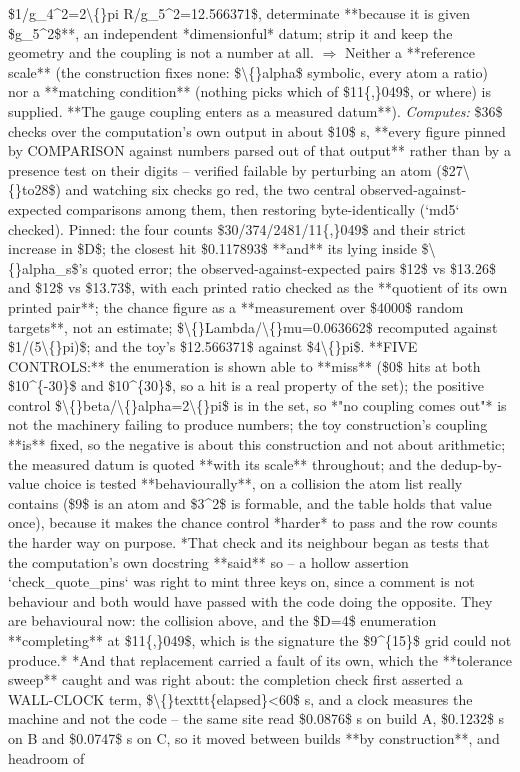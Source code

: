 \begin{description}
\$1/g\_4\textasciicircum{}2=2\textbackslash\{\}pi R/g\_5\textasciicircum{}2=12.566371\$, determinate **because it is given \$g\_5\textasciicircum{}2\$**, an independent *dimensionful* datum; strip it and keep the geometry and the coupling is not a number at all. \ensuremath{\Rightarrow} Neither a **reference scale** (the construction fixes none: \$\textbackslash\{\}alpha\$ symbolic, every atom a ratio) nor a **matching condition** (nothing picks which of \$11\{,\}049\$, or where) is supplied. **The gauge coupling enters as a measured datum**). 
\emph{Computes:} \$36\$ checks over the computation's own output in about \$10\$ s, **every figure pinned by COMPARISON against numbers parsed out of that output** rather than by a presence test on their digits -- verified failable by perturbing an atom (\$27\textbackslash\{\}to28\$) and watching six checks go red, the two central observed-against-expected comparisons among them, then restoring byte-identically (`md5` checked). Pinned: the four counts \$30/374/2481/11\{,\}049\$ and their strict increase in \$D\$; the closest hit \$0.117893\$ **and** its lying inside \$\textbackslash\{\}alpha\_s\$'s quoted error; the observed-against-expected pairs \$12\$ vs \$13.26\$ and \$12\$ vs \$13.73\$, with each printed ratio checked as the **quotient of its own printed pair**; the chance figure as a **measurement over \$4000\$ random targets**, not an estimate; \$\textbackslash\{\}Lambda/\textbackslash\{\}mu=0.063662\$ recomputed against \$1/(5\textbackslash\{\}pi)\$; and the toy's \$12.566371\$ against \$4\textbackslash\{\}pi\$. **FIVE CONTROLS:** the enumeration is shown able to **miss** (\$0\$ hits at both \$10\textasciicircum{}\{-30\}\$ and \$10\textasciicircum{}\{30\}\$, so a hit is a real property of the set); the positive control \$\textbackslash\{\}beta/\textbackslash\{\}alpha=2\textbackslash\{\}pi\$ is in the set, so *"no coupling comes out"* is not the machinery failing to produce numbers; the toy construction's coupling **is** fixed, so the negative is about this construction and not about arithmetic; the measured datum is quoted **with its scale** throughout; and the dedup-by-value choice is tested **behaviourally**, on a collision the atom list really contains (\$9\$ is an atom and \$3\textasciicircum{}2\$ is formable, and the table holds that value once), because it makes the chance control *harder* to pass and the row counts the harder way on purpose.  *That check and its neighbour began as tests that the computation's own docstring **said** so -- a hollow assertion `check\_quote\_pins` was right to mint three keys on, since a comment is not behaviour and both would have passed with the code doing the opposite. They are behavioural now: the collision above, and the \$D=4\$ enumeration **completing** at \$11\{,\}049\$, which is the signature the \$9\textasciicircum{}\{15\}\$ grid could not produce.*  *And that replacement carried a fault of its own, which the **tolerance sweep** caught and was right about: the completion check first asserted a WALL-CLOCK term, \$\textbackslash\{\}texttt\{elapsed\}<60\$ s, and a clock measures the machine and not the code -- the same site read \$0.0876\$ s on build A, \$0.1232\$ s on B and \$0.0747\$ s on C, so it moved between builds **by construction**, and headroom of 
\end{description}
